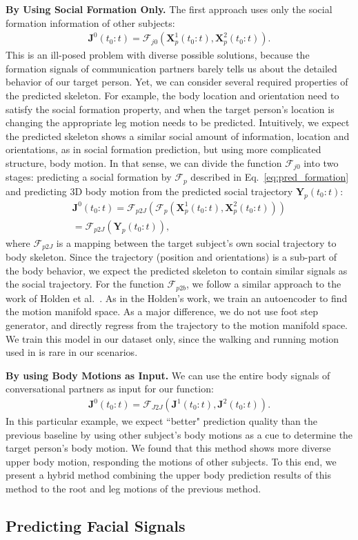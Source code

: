 \textbf{By Using Social Formation Only.} The first approach uses only the social formation information of other subjects:
\begin{gather}	
\mathbf{J}^0(t_0:t) = \mathcal{F}_{j0} ( \mathbf{X}_p^1(t_0:t), \mathbf{X}_p^2(t_0:t) ).
\end{gather}
This is an ill-posed problem with diverse possible solutions, because the formation signals of communication partners barely tells us about the detailed behavior of our target person. Yet, we can consider several required properties of the predicted skeleton. For example, the body location and orientation need to satisfy the social formation property, and when the target person's location is changing the appropriate leg motion needs to be predicted. Intuitively, we expect the predicted skeleton shows a similar social amount of information, location and orientations, as in social formation prediction, but using more complicated structure, body motion. In that sense, we can divide the function $\mathcal{F}_{j0}$ into two stages: predicting a social formation by $\mathcal{F}_p$ described in Eq.~\ref{eq:pred_formation} and predicting 3D body motion from the predicted social trajectory $\mathbf{Y}_p (t_0:t)$:
\begin{gather}	
 \mathbf{J}^0 (t_0:t) = \mathcal{F}_{p2J} \left(   \mathcal{F}_p \left( \mathbf{X}_p^1(t_0:t), \mathbf{X}_p^2(t_0:t) \right) \right) \nonumber \\ 
 = \mathcal{F}_{p2J} \left( \mathbf{Y}_p (t_0:t)  \right),
 \label{eq:pred_p2J}
\end{gather}
where $\mathcal{F}_{p2J}$ is a mapping between the target subject's own social trajectory to body skeleton. Since the trajectory (position and orientations) is a sub-part of the body behavior, we expect the predicted skeleton to contain similar signals as the social trajectory. For the function $\mathcal{F}_{p2b}$, we follow a similar approach to the work of Holden et al.~\cite{holden2016deep}. As in the Holden's work, we train an autoencoder to find the motion manifold space. As a major difference, we do not use foot step generator, and directly regress from the trajectory to the motion manifold space. We train this model in our dataset only, since the walking and running motion used in \cite{holden2016deep} is rare in our scenarios. 

\textbf{By using Body Motions as Input.} We can use the entire body signals of conversational partners as input for our function:
\begin{gather}	
\mathbf{J}^0 (t_0:t) = \mathcal{F}_{J2J} \left( \mathbf{J}^1 (t_0:t), \mathbf{J}^2 (t_0:t) \right) .
\end{gather}
In this particular example, we expect ``better" prediction quality than the previous baseline by using other subject's body motions as a cue to determine the target person's body motion. We found that this method shows more diverse upper body motion, responding the motions of other subjects. To this end, we present a hybrid method combining the upper body prediction results of this method to the root and leg motions of the previous method. 


\subsection{Predicting Facial Signals}